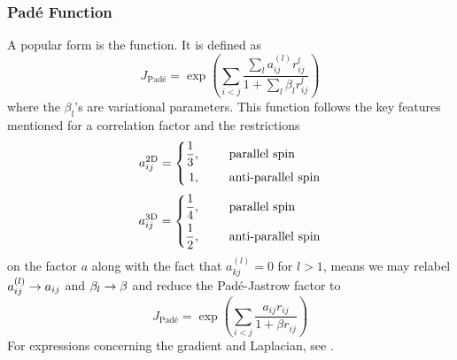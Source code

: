     \subsubsection{Pad\'e Function\label{sususec:TWFPadeJastrow}} 
    A popular form is the  function. It is defined
    as\cite{basicMB, MCAbInitoChem}
            \begin{equation}
                J_{\text{Pad\'e}} =
                \exp\left(\sum\limits_{i<j}\frac{\sum\limits_la^{(l)}_{ij}
                r^l_{ij}}{1 + \sum\limits_l \beta_l r^l_{ij}}\right)
            \end{equation}
        where the $\beta_l$'s are variational parameters. This function follows
        the key features mentioned for a correlation factor and the
        restrictions
            \begin{equation}
                a^{\text{2D}}_{ij} = \left\{\begin{aligned}
                        \frac{1}{3},&\indent& &\text{parallel spin} \\
                        1,&\indent& &\text{anti-parallel spin} \\
                    \end{aligned}\right.
            \end{equation}
            \begin{equation}
                a^{\text{3D}}_{ij} = \left\{\begin{aligned}
                        \frac{1}{4},&\indent& &\text{parallel spin} \\
                        \frac{1}{2},&\indent& &\text{anti-parallel spin} \\
                    \end{aligned}\right.
            \end{equation}
        on the factor $a$ along with the fact that $a^{(l)}_{kj}=0$ for $l>1$,
        means we may relabel $a^{(l)}_{ij}\rightarrow a_{ij}$ and $\beta_l\rightarrow
        \beta$ and reduce the Pad\'e-Jastrow factor to
            \begin{equation}
                J_{\text{Pad\'e}} = \exp\left(\sum\limits_{i<j}\frac{a_{ij}
                r_{ij}}{1 + \beta r_{ij}}\right)
            \end{equation}
        For expressions concerning the gradient and Laplacian, see
        .

